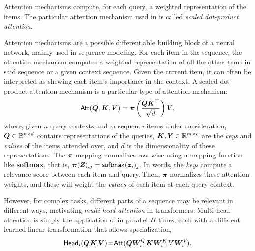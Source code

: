 Attention mechanisms compute, for each query, a weighted
representation of the items. The particular attention mechanism used
in \citet{vaswani2017attention} is called \emph{scaled dot-product
    attention}.

\begin{definition}
    Attention mechanisms are a possible differentiable building block
    of a neural network, mainly used in sequence modeling. For each
    item in the sequence, the attention mechanism computes a weighted
    representation of all the other items in said sequence or a given
    context sequence. Given the current item, it can often be
    interpreted as showing each item's importance in the context. A
    scaled dot-product attention mechanism is a particular type of
    attention mechanism:
    \begin{equation}
        \operatorname{\mathsf{Att}}(\bm{Q}, \bm{K}, \bm{V}) = \bm{\pi}
        \left(\frac{\bm{Q}\bm{K}^\top}{\sqrt{d}}\right) \bm{V},
        \label{eq:att_scaled_dot}
    \end{equation}
    where, given $n$ query contexts and $m$ sequence items under
    consideration, $\bm{Q} \in \mathbb{R}^{n \times d}$ contains
    representations of the queries, $\bm{K}, \bm{V} \in \mathbb{R}^{m
            \times d}$ are the \emph{keys} and \emph{values} of the items
    attended over, and $d$ is the dimensionality of these
    representations. The $\bm{\pi}$ mapping normalizes row-wise using a mapping function like
    \textbf{softmax}, that is, $\bm{\pi}(\bm{Z})_{ij} = \operatorname*{\mathsf{softmax}}(\bm{z}_i)_j$.
    In words, the \emph{keys} compute a relevance score between each item
    and query. Then, $\bm{\pi}$ normalizes these attention weights, and
    these will weight the \emph{values} of each item at each query
    context.
\end{definition}

However, for complex tasks, different parts of a sequence may be
relevant in different ways, motivating \emph{multi-head attention} in
transformers. Multi-head attention is simply the application of
 in parallel $H$ times, each with a
different learned linear transformation that allows specialization,
%
\begin{equation}\label{eq:head}%
    \ath_i(\bm{Q}\!,\!\bm{K}\!,\!\bm{V})\!=\!\att(\bm{QW}_i^Q\!\!,\bm{KW}_i^K\!\!,\bm{VW}_i^V\!).
\end{equation}


